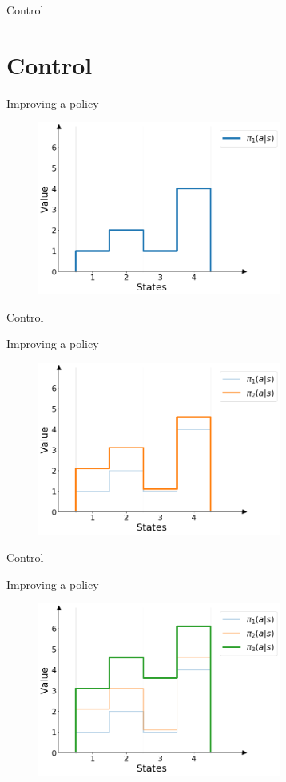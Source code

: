 \documentclass{beamer}
\begin{document}
\begin{frame}{Control}
\section{Control}

Improving a policy

\begin{figure}[t]
\includegraphics[width=8cm]{./images/pi1.png}
\centering
\end{figure}

\end{frame}


\begin{frame}{Control}

Improving a policy

\begin{figure}[t]
\includegraphics[width=8cm]{./images/pi2.png}
\centering
\end{figure}

\end{frame}

\begin{frame}{Control}

Improving a policy

\begin{figure}[t]
\includegraphics[width=8cm]{./images/pi3.png}
\centering
\end{figure}

\end{frame}
\end{document}

